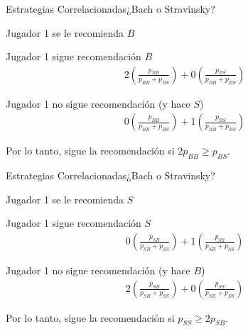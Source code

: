 \documentclass[notes, 11pt]{beamer} %
\newenvironment{wideitemize}{\itemize\addtolength{\itemsep}{10pt}}{\enditemize}
\begin{document}
\begin{frame}{Estrategias Correlacionadas}{¿Bach o Stravinsky?}
\begin{wideitemize}
	\item<1-> Jugador 1 se le recomienda $B$
	\begin{wideitemize}
		\item<2->[--] Jugador 1 sigue recomendaci\'on $B$
		\begin{align*}
			2\left(\frac{p_{BB}}{p_{BB}+p_{BS}}\right) + 0\left(\frac{p_{BS}}{p_{BB}+p_{BS}}\right)
		\end{align*}
		\item<3->[--] Jugador 1 no sigue recomendaci\'on (y hace $S$)
		\begin{align*}
			0\left(\frac{p_{BB}}{p_{BB}+p_{BS}}\right) + 1\left(\frac{p_{BS}}{p_{BB}+p_{BS}}\right)
		\end{align*}
	\end{wideitemize} 
	\item<4-> Por lo tanto, sigue la recomendaci\'on si $2p_{BB}\geq p_{BS}$.
\end{wideitemize}
\end{frame}

\begin{frame}{Estrategias Correlacionadas}{¿Bach o Stravinsky?}
\begin{wideitemize}
	\item<1-> Jugador 1 se le recomienda $S$
	\begin{wideitemize}
		\item<2->[--] Jugador 1 sigue recomendaci\'on $S$
		\begin{align*}
			0\left(\frac{p_{SB}}{p_{SB}+p_{SS}}\right) + 1\left(\frac{p_{SS}}{p_{SB}+p_{SS}}\right)
		\end{align*}
		\item<3->[--] Jugador 1 no sigue recomendaci\'on (y hace $B$)
		\begin{align*}
			2\left(\frac{p_{SB}}{p_{SB}+p_{SS}}\right) + 0\left(\frac{p_{SS}}{p_{SB}+p_{SS}}\right)
		\end{align*}
	\end{wideitemize} 
	\item<4-> Por lo tanto, sigue la recomendaci\'on si $p_{SS}\geq 2p_{SB}$.
\end{wideitemize}
\end{frame}
\end{document}
